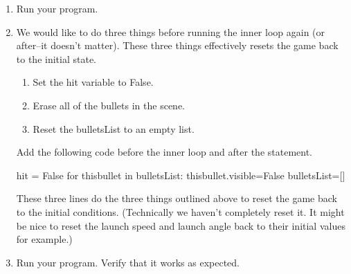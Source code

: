 \begin{enumerate}
	\item Run your program.
	

	\item We would like to do three things before running the inner loop again (or after--it doesn't matter). These three things effectively resets the game back to the initial state.
	
	\begin{enumerate}
		\item Set the hit variable to False.
		\item Erase all of the bullets in the scene.
		\item Reset the bulletsList to an empty list.
	\end{enumerate}
	
	Add the following code before the inner  loop and after the  statement.
	
\begin{myvpython}
    hit = False
    for thisbullet in bulletsList:
        thisbullet.visible=False
    bulletsList=[]
\end{myvpython}
    
    These three lines do the three things outlined above to reset the game back to the initial conditions. (Technically we haven't completely reset it. It might be nice to reset the launch speed and launch angle back to their initial values for example.)
    
    \item Run your program. Verify that it works as expected.

\end{enumerate}

\pagebreak

\analysis

